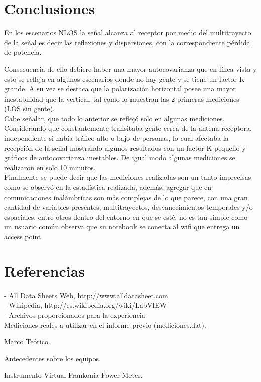 \documentclass[12pt]{article}
\begin{document}
\newpage
\section{Conclusiones}
\begin{spacing}{1.5}
En los escenarios NLOS la señal alcanza al receptor por medio del multitrayecto de la señal 
es decir las reflexiones y dispersiones, con la correspondiente pérdida de potencia.

Consecuencia de ello debiere haber una mayor autocovarianza que en línea vista y esto se refleja 
en algunos escenarios donde no hay gente y se tiene un factor K grande.  A su vez se destaca 
que la polarización horizontal posee una mayor inestabilidad que la vertical, tal como lo muestran 
las 2 primeras mediciones (LOS sin gente).\\

Cabe señalar, que todo lo anterior se reflejó solo en algunas mediciones. Considerando
que constantemente transitaba gente cerca de la antena receptora, independiente si había tráfico 
alto o bajo de personas, lo cual afectaba la recepción de la señal mostrando algunos resultados 
con un factor K pequeño y gráficos de autocovarianza inestables. De igual modo algunas 
mediciones se realizaron en solo 10 minutos.\\

Finalmente se puede decir que las mediciones realizadas son un tanto imprecisas como se observó en 
la estadística realizada, además, agregar que en comunicaciones inalámbricas son más 
complejas de lo que parece, con una gran cantidad de variables presentes, multitrayectos, 
desvanecimientos temporales y/o espaciales, entre otros dentro del entorno en que se
esté, no es tan simple como un usuario común observa que su notebook se conecta al wifi que 
entrega un access point.

\end{spacing}

\newpage
\section{Referencias}

- All Data Sheets Web, http://www.alldatasheet.com \\

- Wikipedia, http://es.wikipedia.org/wiki/LabVIEW \\
 
- Archivos proporcionados para la experiencia \\

\qquad Mediciones reales a utilizar en el informe previo (mediciones.dat).

\qquad Marco Teórico.

\qquad Antecedentes sobre los equipos.

\qquad Instrumento Virtual Frankonia Power Meter.
\end{document}
